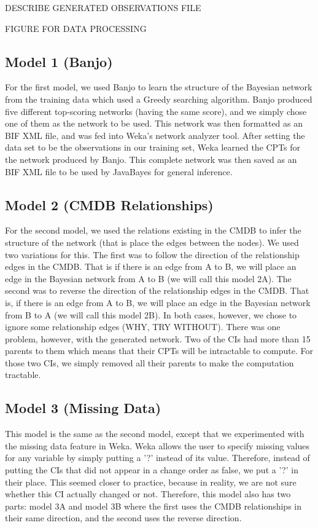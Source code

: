 \documentclass{article}
\begin{document}
DESCRIBE GENERATED OBSERVATIONS FILE

FIGURE FOR DATA PROCESSING

\subsection{Model 1 (Banjo)}
\label{sec:model1}

For the first model, we used Banjo to learn the structure of the Bayesian network from the training data which used a Greedy searching algorithm. Banjo
produced five different top-scoring networks (having the same score), and we simply chose one of them as the network to be used. This network was then
formatted as an BIF XML file, and was fed into Weka's network analyzer tool. After setting the data set to be the observations in our training set, Weka
learned the CPTs for the network produced by Banjo. This complete network was then saved as an BIF XML file to be used by JavaBayes for general inference.


\subsection{Model 2 (CMDB Relationships)}

For the second model, we used the relations existing in the CMDB to infer the structure of the network (that is place the edges between the nodes). We used two
variations for this. The first was to follow the direction of the relationship edges in the CMDB. That is if there is an edge from A to B, we will place an
edge in the Bayesian network from A to B (we will call this model 2A). The second was to reverse the direction of the relationship edges in the CMDB. That is,
if there is an edge from A to B, we will place an edge in the Bayesian network from B to A (we will call this model 2B). In both cases, however, we chose to
ignore some relationship edges (WHY, TRY WITHOUT). There was one problem, however, with the generated network. Two of the CIs had more than 15 parents to them
which means that their CPTs will be intractable to compute. For those two CIs, we simply removed all their parents to make the computation tractable.


\subsection{Model 3 (Missing Data)}

This model is the same as the second model, except that we experimented with the missing data feature in Weka. Weka allows the user to specify missing values
for any variable by simply putting a '?' instead of its value. Therefore, instead of putting the CIs that did not appear in a change order as false, we put a
'?' in their place. This seemed closer to practice, because in reality, we are not sure whether this CI actually changed or not. Therefore, this model also has
two parts: model 3A and model 3B where the first uses the CMDB relationships in their same direction, and the second uses the reverse direction.
\end{document}

